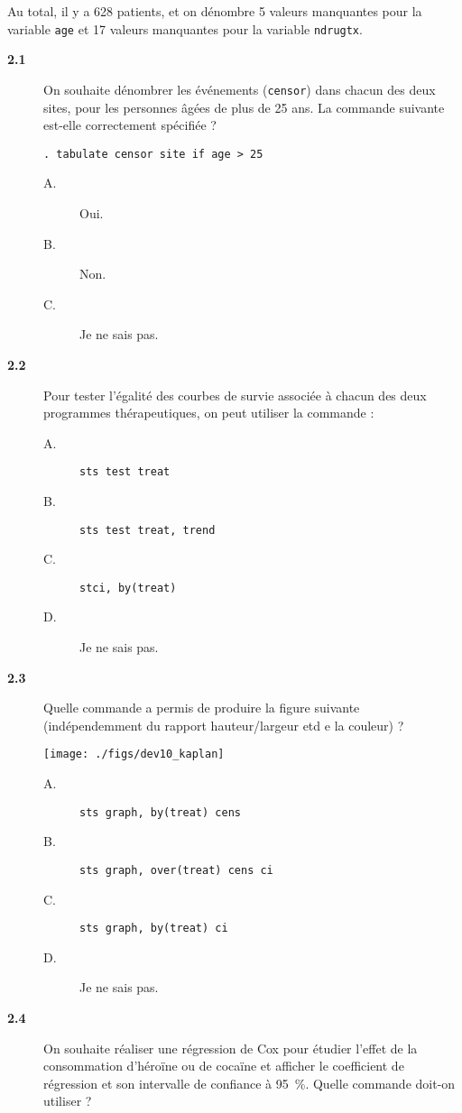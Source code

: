 Au total, il y a 628 patients, et on dénombre 5 valeurs manquantes pour la
variable \texttt{age} et 17 valeurs manquantes pour la variable
\texttt{ndrugtx}. 
\begin{description}
\item[\bf 2.1] On souhaite dénombrer les événements (\texttt{censor}) dans
  chacun des deux sites, pour les personnes âgées de plus de 25 ans. La
  commande suivante est-elle correctement spécifiée ? 
\begin{verbatim}
. tabulate censor site if age > 25
\end{verbatim}
\begin{description}
\item[A.] Oui.
\item[B.] Non.
\item[C.] Je ne sais pas.
\end{description}
\item[\bf 2.2] Pour tester l'égalité des courbes de survie associée à chacun
  des deux programmes thérapeutiques, on peut utiliser la commande :
\begin{description}
\item[A.] \verb|sts test treat|
\item[B.] \verb|sts test treat, trend|
\item[C.] \verb|stci, by(treat)|
\item[D.] Je ne sais pas.
\end{description}
\item[\bf 2.3] Quelle commande a permis de produire la figure suivante
  (indépendemment du rapport hauteur/largeur etd e la couleur) ?
  \begin{center}
    \texttt{[image: ./figs/dev10\_kaplan]}
  \end{center}
\begin{description}
\item[A.] \verb|sts graph, by(treat) cens|
\item[B.] \verb|sts graph, over(treat) cens ci|
\item[C.] \verb|sts graph, by(treat) ci|
\item[D.] Je ne sais pas.
\end{description}
\item[\bf 2.4] On souhaite réaliser une régression de Cox pour étudier
  l'effet de la consommation d'héroïne ou de cocaïne et afficher le
  coefficient de régression et son intervalle de confiance à 95~\%. Quelle
  commande doit-on utiliser ? 

\end{description}
